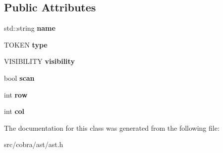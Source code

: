 \subsection*{Public Attributes}
\begin{DoxyCompactItemize}
\item 
\hypertarget{class_cobra_1_1internal_1_1_a_s_t_node_a009c5e13135b18c7475bb0bb6e1751e5}{std\+::string {\bfseries name}}\label{class_cobra_1_1internal_1_1_a_s_t_node_a009c5e13135b18c7475bb0bb6e1751e5}

\item 
\hypertarget{class_cobra_1_1internal_1_1_a_s_t_node_a94f2dac0233b841edddeeed35e768868}{T\+O\+K\+E\+N {\bfseries type}}\label{class_cobra_1_1internal_1_1_a_s_t_node_a94f2dac0233b841edddeeed35e768868}

\item 
\hypertarget{class_cobra_1_1internal_1_1_a_s_t_node_a845a463b42877638f089bd1bd2a6c973}{V\+I\+S\+I\+B\+I\+L\+I\+T\+Y {\bfseries visibility}}\label{class_cobra_1_1internal_1_1_a_s_t_node_a845a463b42877638f089bd1bd2a6c973}

\item 
\hypertarget{class_cobra_1_1internal_1_1_a_s_t_node_addf036b6ff25716a32e763328c2f4837}{bool {\bfseries scan}}\label{class_cobra_1_1internal_1_1_a_s_t_node_addf036b6ff25716a32e763328c2f4837}

\item 
\hypertarget{class_cobra_1_1internal_1_1_a_s_t_node_a4b38b68b9d85d0b2756dfb8481a92399}{int {\bfseries row}}\label{class_cobra_1_1internal_1_1_a_s_t_node_a4b38b68b9d85d0b2756dfb8481a92399}

\item 
\hypertarget{class_cobra_1_1internal_1_1_a_s_t_node_acb5d20f5ce2459ca952ac90bf825160d}{int {\bfseries col}}\label{class_cobra_1_1internal_1_1_a_s_t_node_acb5d20f5ce2459ca952ac90bf825160d}

\end{DoxyCompactItemize}


The documentation for this class was generated from the following file\+:\begin{DoxyCompactItemize}
\item 
src/cobra/ast/ast.\+h\end{DoxyCompactItemize}
